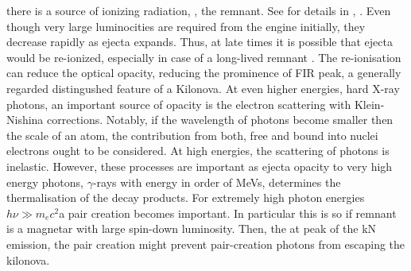 there is a source of ionizing radiation, \eg, the remnant. 
See for details in \eg, \citet{Metzger:2013cha}. 
Even though very large luminocities are required from the engine initially, 
they decrease rapidly as ejecta expands. Thus, at late times it is possible that ejecta would be 
re-ionized, especially in case of a long-lived remnant \citep{Metzger:2013cha}. The re-ionisation 
can reduce the optical opacity, reducing the prominence of \ac{FIR} peak, 
a generally regarded distingushed feature of a Kilonova.
%
At even higher energies, hard X-ray photons, an important source of opacity is the 
electron scattering with Klein-Nishina corrections. Notably, if the wavelength of photons 
become smaller then the scale of an atom, the contribution from both, free and bound into 
nuclei electrons ought to be considered. At high energies, the scattering of photons is inelastic. 
However, these processes are important as ejecta opacity to very high energy photons, 
$\gamma$-rays with energy in order of MeVs, determines the thermalisation of the \rproc{} 
decay products.
%
For extremely high photon energies $h\nu \gg m_e c^2$a pair creation becomes important. 
In particular this is so if remnant is a magnetar with large spin-down luminosity. 
Then, the at peak of the \ac{kN} emission, the pair creation might prevent pair-creation 
photons from escaping the kilonova. 



